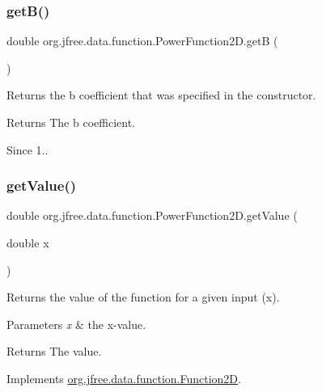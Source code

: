 \subsubsection{\texorpdfstring{get\+B()}{getB()}}
{\footnotesize\ttfamily double org.\+jfree.\+data.\+function.\+Power\+Function2\+D.\+getB (\begin{DoxyParamCaption}{ }\end{DoxyParamCaption})}

Returns the \textquotesingle{}b\textquotesingle{} coefficient that was specified in the constructor.

\begin{DoxyReturn}{Returns}
The \textquotesingle{}b\textquotesingle{} coefficient.
\end{DoxyReturn}
\begin{DoxySince}{Since}
1.. 
\end{DoxySince}
\mbox{\label{classorg_1_1jfree_1_1data_1_1function_1_1_power_function2_d_a28cc5f0b43b89599f306191d83b99f6c}} 
\subsubsection{\texorpdfstring{get\+Value()}{getValue()}}
{\footnotesize\ttfamily double org.\+jfree.\+data.\+function.\+Power\+Function2\+D.\+get\+Value (\begin{DoxyParamCaption}\item[{double}]{x }\end{DoxyParamCaption})}

Returns the value of the function for a given input (\textquotesingle{}x\textquotesingle{}).


\begin{DoxyParams}{Parameters}
{\em x} & the x-\/value.\\
\hline
\end{DoxyParams}
\begin{DoxyReturn}{Returns}
The value. 
\end{DoxyReturn}


Implements \mbox{\hyperlink{interfaceorg_1_1jfree_1_1data_1_1function_1_1_function2_d_a0f925a1dfe40f894d7f763f39320db22}{org.\+jfree.\+data.\+function.\+Function2D}}.

